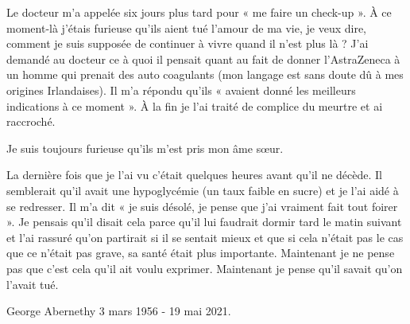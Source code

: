 Le docteur m’a appelée six jours plus tard pour « me faire un check-up ». À ce
moment-là j’étais furieuse qu’ils aient tué l’amour de ma vie, je veux dire,
comment je suis supposée de continuer à vivre quand il n’est plus là ? J’ai
demandé au docteur ce à quoi il pensait quant au fait de donner l’AstraZeneca à
un homme qui prenait des auto coagulants (mon langage est sans doute dû à mes
origines Irlandaises). Il m’a répondu qu’ils « avaient donné les meilleurs
indications à ce moment ». À la fin je l’ai traité de complice du meurtre et ai
raccroché.

Je suis toujours furieuse qu’ils m’est pris mon âme sœur.

La dernière fois que je l’ai vu c’était quelques heures avant qu’il ne
décède. Il semblerait qu’il avait une hypoglycémie (un taux faible en sucre) et
je l’ai aidé à se redresser. Il m’a dit « je suis désolé, je pense que j’ai
vraiment fait tout foirer ». Je pensais qu’il disait cela parce qu’il lui
faudrait dormir tard le matin suivant et l’ai rassuré qu’on partirait si il se
sentait mieux et que si cela n’était pas le cas que ce n’était pas grave, sa
santé était plus importante. Maintenant je ne pense pas que c’est cela qu’il ait
voulu exprimer. Maintenant je pense qu’il savait qu’on l’avait tué.

George Abernethy 3 mars 1956 - 19 mai 2021.
